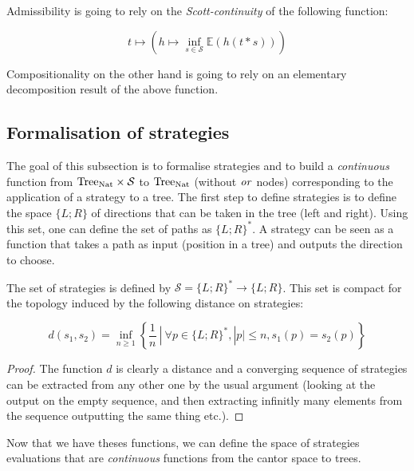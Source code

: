 Admissibility is going to rely on the \emph{Scott-continuity} 
of the following function:

\begin{equation*}
    t \mapsto \left(h \mapsto \inf_{s \in \mathcal{S}} \mathbb{E} (h
(t*s))\right)
\end{equation*}

Compositionality on the other hand is going to rely on an elementary 
decomposition result of the above function.

\subsection{Formalisation of strategies} 

The goal of this subsection is to formalise strategies and 
to build a \emph{continuous} function from $\textnormal{Tree}_{\textnormal{Nat}} \times \mathcal{S}$
to $\textnormal{Tree}_{\textnormal{Nat}}$ (without $\operatorname{\mathit{or}}$ nodes) corresponding to the 
application of a strategy to a tree.
The first step to define strategies is to define the space 
$\{ L; R\}$ of directions that can be taken in the tree (left and right).
Using this set, one can define the set of paths as $\{ L; R \}^*$. A 
strategy can be seen as a function that takes a path as input (position 
in a tree) and outputs the direction to choose.

\begin{definition}[Strategies]
     The set of strategies is 
     defined by $\mathcal{S} = \{ L;R\}^* \to \{ L; R\}$.
     This set is compact for the topology induced by the 
     following distance on strategies:

     \begin{equation*}
         d(s_1,s_2) = \inf_{n \geq 1} \left\{ \frac{1}{n} ~|~ \forall p \in \{ L;R\}^*,
                                         |p| \leq n, s_1(p) = s_2(p) \right\}
     \end{equation*}
\end{definition}

\begin{proof}
    The function $d$ is clearly a distance and a converging sequence 
    of strategies can be extracted from any other one by the usual argument 
    (looking at the output on the empty sequence, and then extracting
    infinitly many elements from the sequence outputting the same thing etc.).
\end{proof}

Now that we have theses functions, we can define the space 
of strategies evaluations that are \emph{continuous}
functions from the cantor space to trees. 

